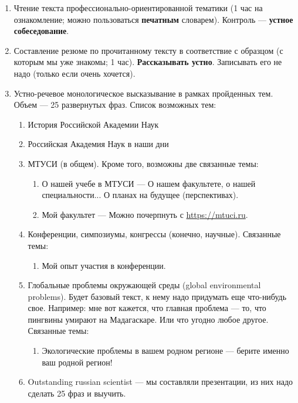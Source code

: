 \documentclass{article}
\begin{document}
\begin{enumerate}
    \item Чтение текста профессионально-ориентированной тематики (1 час на ознакомление; можно пользоваться \textbf{печатным} словарем). Контроль — \textbf{устное собеседование}.
    \item Составление резюме по прочитанному тексту в соответствие с образцом (с которым мы уже знакомы; 1 час). \textbf{Рассказывать устно}. Записывать его не надо (только если очень хочется).
    \item Устно-речевое монологическое высказывание в рамках пройденных тем. Объем — 25 развернутых фраз. Список возможных тем:
    \begin{enumerate}
        \item История Российской Академии Наук
        \item Российская Академия Наук в наши дни
        \item МТУСИ (в общем). Кроме того, возможны две связанные темы:
        \begin{enumerate}
            \item О нашей учебе в МТУСИ — О нашем факультете, о нашей специальности... О планах на будущее (перспективах).
            \item Мой факультет — Можно почерпнуть с \url{https://mtuci.ru}.
        \end{enumerate}
        \item Конференции, симпозиумы, конгрессы (конечно, научные). Связанные темы:
        \begin{enumerate}
            \item Мой опыт участия в конференции.
        \end{enumerate}
        \item Глобальные проблемы окружающей среды (global environmental problems). Будет базовый текст, к нему надо придумать еще что-нибудь свое. Например: мне вот кажется, что главная проблема — то, что пингвины умирают на Мадагаскаре. Или что угодно любое другое. Связанные темы:
        \begin{enumerate}
            \item Экологические проблемы в вашем родном регионе — берите именно ваш родной регион!
        \end{enumerate}
        \item Outstanding russian scientist — мы составляли презентации, из них надо сделать 25 фраз и выучить.
    \end{enumerate}
\end{enumerate}
\end{document}
